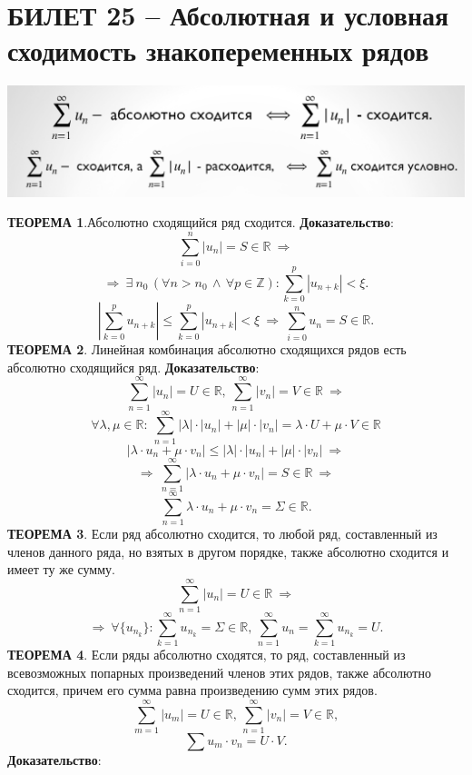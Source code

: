 \documentclass{article}
\newcommand{\R}{\mathbb R}
\newcommand{\Z}{\mathbb Z}
\begin{document}
\section{БИЛЕТ 25 -- Абсолютная и условная сходимость знакопеременных рядов}
\begin{center}
\includegraphics[scale=0.4]{7.jpg}
\end{center}
\textbf{ТЕОРЕМА 1}.Абсолютно сходящийся ряд сходится.
\newline
\newline
\textbf{Доказательство}:
$$ \sum_{i=0}^{n}|u_{n}|=S\in\R\:\Rightarrow $$
$$\Rightarrow\:\exists\:n_{0}\,(\forall n>n_{0}\,\land\,\forall p\in\Z):\sum_{k=0}^{p}|u_{n+k}|<\xi.  $$
$$ \left| \sum_{k=0}^{p} u_{n+k} \right|\leqslant\sum_{k=0}^{p}|u_{n+k}|<\xi\:\Rightarrow\:\sum_{i=0}^{n}u_{n}=S\in\R. $$
\textbf{ТЕОРЕМА 2}. Линейная комбинация абсолютно сходящихся рядов есть абсолютно сходящийся ряд.
\newline
\newline
\textbf{Доказательство}:
$$ \sum_{n=1}^{\infty}|u_{n}|=U\in\R,\,\sum_{n=1}^{\infty}|v_{n}|=V\in\R\:\Rightarrow $$
$$ \forall\lambda,\mu\in\R:\:\sum_{n=1}^{\infty}|\lambda|\cdot|u_{n}|+|\mu|\cdot|v_{n}|=\lambda\cdot U+\mu\cdot V\in\R $$
$$|\lambda\cdot u_{n}+\mu\cdot v_{n}|\leqslant|\lambda|\cdot |u_{n}|+|\mu|\cdot |v_{n}|\:\Rightarrow$$
$$ \Rightarrow\:\sum_{n=1}^{\infty}|\lambda\cdot u_{n}+\mu\cdot v_{n}|=S\in\R\:\Rightarrow $$
$$\sum_{n=1}^{\infty}\lambda\cdot u_{n}+\mu\cdot v_{n}=\Sigma\in\R.  $$
\newpage
\textbf{ТЕОРЕМА 3}. Если ряд абсолютно сходится, то любой ряд, составленный из членов данного ряда, но взятых в другом порядке, также абсолютно сходится и имеет ту же сумму.
$$ \sum_{n=1}^{\infty}|u_{n}|=U\in\R\:\Rightarrow $$
$$ \Rightarrow\:\forall \{u_{n_{k}}\}:\sum_{k=1}^{\infty}u_{n_{k}}=\Sigma\in\R,\,\sum_{n=1}^{\infty}u_{n}=\sum_{k=1}^{\infty}u_{n_{k}}=U. $$
\textbf{ТЕОРЕМА 4}. Если ряды абсолютно сходятся, то ряд, составленный из всевозможных попарных произведений членов этих рядов, также абсолютно сходится, причем его сумма равна произведению сумм этих рядов.
$$ \sum_{m=1}^{\infty}|u_{m}|=U\in\R,\,\sum_{n=1}^{\infty}|v_{n}|=V\in\R,$$
$$ \sum u_{m}\cdot v_{n}=U\cdot V. $$
\textbf{Доказательство}:
\end{document}
